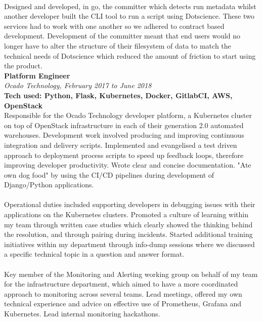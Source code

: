 \documentclass{article}
\begin{document}
\begin{flushleft}
\paragraph{}Designed and developed, in go, the committer which detects run metadata whilst another developer built the CLI tool to run a script using Dotscience. These two services had to work with one another so we adhered to contract based development. Development of the committer meant that end users would no longer have to alter the structure of their filesystem of data to match the technical needs of Dotscience which reduced the amount of friction to start using the product.\\[10pt]

\textbf{Platform Engineer}\\
\textit{Ocado Technology, February 2017 to June 2018}\\
\textbf{Tech used: Python, Flask, Kubernetes, Docker, GitlabCI, AWS, OpenStack}\\[5pt]
Responsible for the Ocado Technology developer platform, a Kubernetes cluster on top of OpenStack infrastructure in each of their generation 2.0 automated warehouses. Development work involved producing and improving continuous integration and delivery scripts. Implemented and evangelised a test driven approach to deployment process scripts to speed up feedback loops, therefore improving developer productivity. Wrote clear and concise documentation. "Ate own dog food" by using the CI/CD pipelines during development of Django/Python applications.

\paragraph{}Operational duties included supporting developers in debugging issues with their applications on the Kubernetes clusters. Promoted a culture of learning within my team through written case studies which clearly showed the thinking behind the resolution, and through pairing during incidents. Started additional training initiatives within my department through info-dump sessions where we discussed a specific technical topic in a question and answer format.

\paragraph{}Key member of the Monitoring and Alerting working group on behalf of my team for the infrastructure department, which aimed to have a more coordinated approach to monitoring across several teams. Lead meetings, offered my own technical experience and advice on effective use of Prometheus, Grafana and Kubernetes. Lead internal monitoring hackathons.


\end{flushleft}
\end{document}
